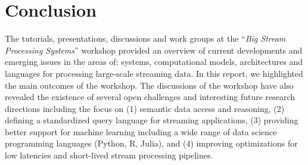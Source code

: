 \section{Conclusion}\label{sec:conclusion}
The tutorials, presentations, discussions and work groups at the ``\emph{Big Stream
  Processing Systems}'' workshop provided an overview of current developments and emerging issues in the areas of: systems,
computational models, architectures and languages for processing large-scale streaming data.
In this report, we highlighted the main outcomes of the workshop. The discussions of the workshop have also revealed the existence of several open challenges and interesting future research directions including the focus on (1) semantic data access and reasoning, (2) defining a standardized query language for streaming applications, (3) providing better support for machine learning including a wide range of data science programming languages (Python, R, Julia), and (4) improving optimizations for low latencies and short-lived stream processing pipelines.
